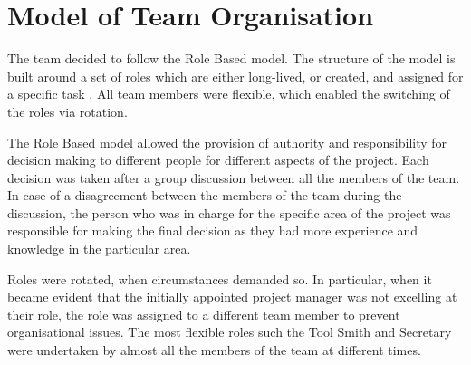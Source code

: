\documentclass{l3proj}
\begin{document}
\section{Model of Team Organisation}
The team decided to follow the Role Based model. The structure of the model is built around a set of roles which are either long-lived, or created, and assigned for a specific task \cite{PSD}. All team members were flexible, which enabled the switching of the roles via rotation.
\par
The Role Based model allowed the provision of authority and responsibility for decision making to different people for different aspects of the project. Each decision was taken after a group discussion between all the members of the team. In case of a disagreement between the members of the team during the discussion, the person who was in charge for the specific area of the project was responsible for making the final decision as they had more experience and knowledge in the particular area.
\par
Roles were rotated, when circumstances demanded so. In particular, when it became evident that the initially appointed project manager was not excelling at their role, the role was assigned to a different team member to prevent organisational issues. The most flexible roles such the Tool Smith and Secretary were undertaken by almost all the members of the team at different times.
\end{document}
